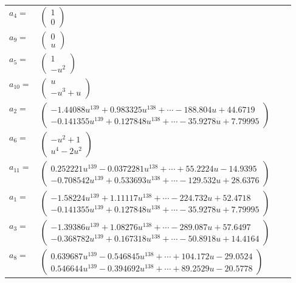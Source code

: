 \documentclass[1p]{elsarticle_modified}
\theoremstyle{definition}
\begin{document}
\begin{tabular}{m{7pt} m{180pt} m{7pt} m{180pt} }
\flushright $a_{4}=$&$\begin{pmatrix}1\\0\end{pmatrix}$ \\
\flushright $a_{9}=$&$\begin{pmatrix}0\\u\end{pmatrix}$ \\
\flushright $a_{5}=$&$\begin{pmatrix}1\\- u^2\end{pmatrix}$ \\
\flushright $a_{10}=$&$\begin{pmatrix}u\\- u^3+u\end{pmatrix}$ \\
\flushright $a_{2}=$&$\begin{pmatrix}-1.44088 u^{139}+0.983325 u^{138}+\cdots-188.804 u+44.6719\\-0.141355 u^{139}+0.127848 u^{138}+\cdots-35.9278 u+7.79995\end{pmatrix}$ \\
\flushright $a_{6}=$&$\begin{pmatrix}- u^2+1\\u^4-2 u^2\end{pmatrix}$ \\
\flushright $a_{11}=$&$\begin{pmatrix}0.252221 u^{139}-0.0372281 u^{138}+\cdots+55.2224 u-14.9395\\-0.708542 u^{139}+0.533693 u^{138}+\cdots-129.532 u+28.6376\end{pmatrix}$ \\
\flushright $a_{1}=$&$\begin{pmatrix}-1.58224 u^{139}+1.11117 u^{138}+\cdots-224.732 u+52.4718\\-0.141355 u^{139}+0.127848 u^{138}+\cdots-35.9278 u+7.79995\end{pmatrix}$ \\
\flushright $a_{3}=$&$\begin{pmatrix}-1.39386 u^{139}+1.08276 u^{138}+\cdots-289.087 u+57.6497\\-0.368782 u^{139}+0.167318 u^{138}+\cdots-50.8918 u+14.4164\end{pmatrix}$ \\
\flushright $a_{8}=$&$\begin{pmatrix}0.639687 u^{139}-0.546845 u^{138}+\cdots+104.172 u-29.0524\\0.546644 u^{139}-0.394692 u^{138}+\cdots+89.2529 u-20.5778\end{pmatrix}$ \\

\end{tabular}
\end{document}

